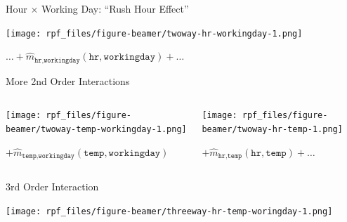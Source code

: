 \documentclass[aspectratio=169,12pt]{beamer}
\begin{document}
\begin{frame}{Hour \(\times\) Working Day: ``Rush Hour Effect''}
\label{hour-times-working-day-rush-hour-effect}
\begin{center}
\texttt{[image: rpf\_files/figure-beamer/twoway-hr-workingday-1.png]}
\end{center}

\(\ldots + \hat{m}_{\texttt{hr}, \texttt{workingday}}(\texttt{hr}, \texttt{workingday}) + \ldots\)
\end{frame}

\begin{frame}{More 2nd Order Interactions}
\label{more-2nd-order-interactions}
\begin{columns}[T]
\begin{column}{0.5\linewidth}
\begin{center}
\texttt{[image: rpf\_files/figure-beamer/twoway-temp-workingday-1.png]}
\end{center}

\(+ \hat{m}_{\texttt{temp}, \texttt{workingday}}(\texttt{temp}, \texttt{workingday})\)
\end{column}

\pause

\begin{column}{0.5\linewidth}
\begin{center}
\texttt{[image: rpf\_files/figure-beamer/twoway-hr-temp-1.png]}
\end{center}

\(+ \hat{m}_{\texttt{hr}, \texttt{temp}}(\texttt{hr}, \texttt{temp}) + \ldots\)
\end{column}
\end{columns}
\end{frame}

\begin{frame}{3rd Order Interaction}
\label{rd-order-interaction}
\begin{center}
\texttt{[image: rpf\_files/figure-beamer/threeway-hr-temp-woringday-1.png]}
\end{center}
\end{frame}
\end{document}
